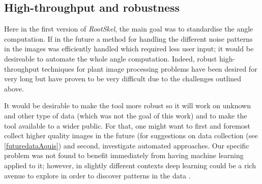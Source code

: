 \subsection{High-throughput and robustness}

Here in the first version of \textit{RootSkel}, the main goal was to standardise the angle computation. If in the future  a method for handling the different noise patterns in the images was efficiently handled which required less user input; it would be desireable to automate the whole angle computation. Indeed, robust high-throughput techniques for plant image processing problems have been desired for very long \cite{hartmann2011htpheno,diener2013automated,lee2018automated,plantCV} but have proven to be very difficult due to the challenges outlined above.









It would be desirable to make the tool more robust so it will work on unknown and other type of data (which was not the goal of this work) and to make the tool available to a wider public. For that, one might want to first and foremost collect higher quality images in the future (for suggestions on data collection (see \ref{futuredataAquis}) and second, investigate automated approaches. %
Our specific problem was not found to benefit immediately from having machine learning applied to it; however, in slightly different contexts deep learning could be a rich avenue to explore in order to discover patterns in the data \cite{pound2017deep,lee2018automated}.

